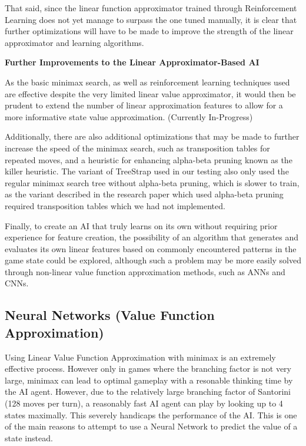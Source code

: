\documentclass[a4paper,12pt,table]{article}
\begin{document}
That said, since the linear function approximator trained through Reinforcement Learning does not yet manage to surpass the one tuned manually, it is clear that further optimizations will have to be made to improve the strength of the linear approximator and learning algorithms. \par

\textbf{Further Improvements to the Linear Approximator-Based AI}

As the basic minimax search, as well as reinforcement learning techniques used are effective despite the very limited linear value approximator, it would then be prudent to extend the number of linear approximation features to allow for a more informative state value approximation. (Currently In-Progress) \par

Additionally, there are also additional optimizations that may be made to further increase the speed of the minimax search, such as transposition tables for repeated moves, and a heuristic for enhancing alpha-beta pruning known as the killer heuristic. The variant of TreeStrap used in our testing also only used the regular minimax search tree without alpha-beta pruning, which is slower to train, as the variant described in the research paper which used alpha-beta pruning required transposition tables which we had not implemented. \par


Finally, to create an AI that truly learns on its own without requiring prior experience for feature creation, the possibility of an algorithm that generates and evaluates its own linear features based on commonly encountered patterns in the game state could be explored, although such a problem may be more easily solved through non-linear value function approximation methods, such as ANNs and CNNs. \par


\subsection{Neural Networks (Value Function Approximation)}

Using Linear Value Function Approximation with minimax is an extremely effective process. However only in games where the branching factor is not very large, minimax can lead to optimal gameplay with a resonable thinking time by the AI agent. However, due to the relatively large branching factor of Santorini (128 moves per turn), a reasonably fast AI agent can play by looking up to 4 states maximally. This severely handicaps the performance of the AI. This is one of the main reasons to attempt to use a Neural Network to predict the value of a state instead. \par
\end{document}
